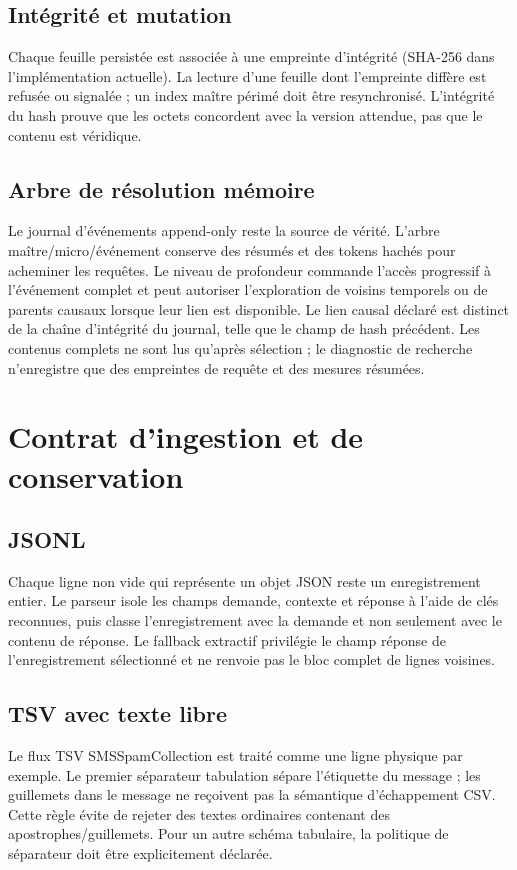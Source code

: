 \documentclass[11pt,a4paper]{article}
\begin{document}
\subsection{Intégrité et mutation}
Chaque feuille persistée est associée à une empreinte d'intégrité (SHA-256 dans l'implémentation actuelle). La lecture d'une feuille dont l'empreinte diffère est refusée ou signalée ; un index maître périmé doit être resynchronisé. L'intégrité du hash prouve que les octets concordent avec la version attendue, pas que le contenu est véridique.

\subsection{Arbre de résolution mémoire}
Le journal d'événements append-only reste la source de vérité. L'arbre maître/micro/événement conserve des résumés et des tokens hachés pour acheminer les requêtes. Le niveau de profondeur commande l'accès progressif à l'événement complet et peut autoriser l'exploration de voisins temporels ou de parents causaux lorsque leur lien est disponible. Le lien causal déclaré est distinct de la chaîne d'intégrité du journal, telle que le champ de hash précédent. Les contenus complets ne sont lus qu'après sélection ; le diagnostic de recherche n'enregistre que des empreintes de requête et des mesures résumées.

\section{Contrat d'ingestion et de conservation}
\subsection{JSONL}
Chaque ligne non vide qui représente un objet JSON reste un enregistrement entier. Le parseur isole les champs demande, contexte et réponse à l'aide de clés reconnues, puis classe l'enregistrement avec la demande et non seulement avec le contenu de réponse. Le fallback extractif privilégie le champ réponse de l'enregistrement sélectionné et ne renvoie pas le bloc complet de lignes voisines.

\subsection{TSV avec texte libre}
Le flux TSV SMSSpamCollection est traité comme une ligne physique par exemple. Le premier séparateur tabulation sépare l'étiquette du message ; les guillemets dans le message ne reçoivent pas la sémantique d'échappement CSV. Cette règle évite de rejeter des textes ordinaires contenant des apostrophes/guillemets. Pour un autre schéma tabulaire, la politique de séparateur doit être explicitement déclarée.
\end{document}
